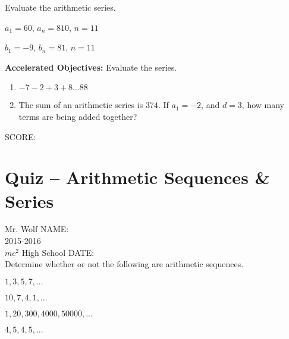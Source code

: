 \documentclass[12pt]{article}
\begin{document}
Evaluate the arithmetic series.\\

\begin{enumerate}[resume]
\begin{multicols}{2}

	\item $a_1=60$, $a_n=810$, $n=11$\\
	
	\item $b_1=-9$, $b_n=81$, $n=11$\\

\end{multicols}
\end{enumerate}

\textbf{Accelerated Objectives:} Evaluate the series.

\begin{enumerate}[resume]
\setlength\itemsep{1.7cm}

	\item $-7-2+3+8...88$\\
	
	\item The sum of an arithmetic series is $374$. If $a_1=-2$, and $d=3$, how many terms are being added together?

\end{enumerate}

\vfill SCORE:\underline{\hspace{1in}}

\section*{Quiz -- Arithmetic Sequences \& Series}

Mr. Wolf \hfill NAME:\underline{\hspace{3in}}\\
2015-2016\\
$mc^2$ High School \hfill DATE:\underline{\hspace{2in}}\\

Determine whether or not the following are arithmetic sequences.

\begin{enumerate}
\begin{multicols}{2}
\setlength\itemsep{1.2cm}

	\item $1,3,5,7,...$\\
	
	\item $10,7,4,1,...$\\
	
	\item $1,20,300,4000,50000,...$\\
	
	\item $4,5,4,5,...$\\

\end{multicols}
\end{enumerate}
\end{document}
